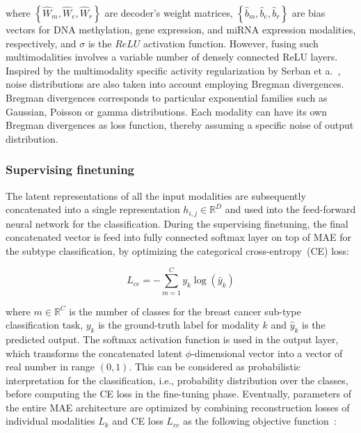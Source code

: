 \hspace*{3.5mm} where $\left\{\hat W_{m}, \hat W_{e}, \hat W_{r}\right\}$ are decoder's weight matrices, $\left\{\hat b_{m}, \hat b_{e}, \hat b_{r}\right\}$ are bias vectors for DNA methylation, gene expression, and miRNA expression modalities, respectively, and $\sigma$ is the $ReLU$ activation function. However, fusing such multimodalities involves a variable number of densely connected ReLU layers. Inspired by the multimodality specific activity regularization by Serban et a.~\cite{serban2016multi}, noise distributions are also taken into account employing Bregman divergences. Bregman divergences corresponds to particular exponential families such as Gaussian, Poisson or gamma distributions. Each modality can have its own Bregman divergences as loss function, thereby assuming a specific noise of output distribution. 

\subsubsection{Supervising finetuning} 
The latent representations of all the input modalities are subsequently concatenated into a single representation $h_{i,j} \in \mathbb{R}^{D}$ and used into the feed-forward neural network for the classification. During the supervising finetuning, the final concatenated vector is feed into fully connected softmax layer on top of MAE for the subtype classification, by optimizing the categorical cross-entropy~(CE) loss: 

\begin{equation} 
    L_{ce}=-\sum_{m=1}^{C} y_{k} \log \left(\hat{y}_{k}\right)
\end{equation} 

\hspace*{3.5mm} where $m \in \mathbb{R}^{C}$ is the number of classes for the breast cancer sub-type classification task, $y_{k}$ is the ground-truth label for modality $k$ and $\hat{y}_{k}$ is the predicted output. The softmax activation function is used in the output layer, which transforms the concatenated latent $\phi$-dimensional vector into a vector of real number in range $\left(0,1\right)$. This can be considered as probabilistic interpretation for the classification, i.e., probability distribution over the classes, before computing the CE loss in the fine-tuning phase. Eventually, parameters of the entire MAE architecture are optimized by combining reconstruction losses of individual modalities ${L}_{k}$ and CE loss ${L}_{ce}$ as the following objective function~\cite{mmdcae}: 

